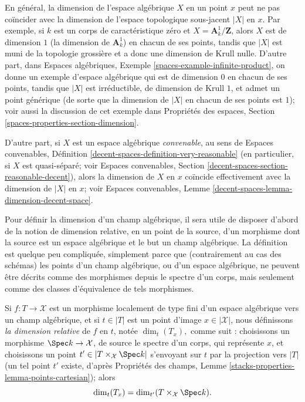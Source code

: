 \begin{remark}
\label{remark-dimension-algebraic-space}
En général, la dimension de l'espace algébrique $X$ en un point $x$
peut ne pas coïncider avec la dimension de l'espace topologique sous-jacent
$|X|$ en $x$. Par exemple, si $k$ est un corps de caractéristique zéro et
$X =  \mathbf{A}^1_k / \mathbf{Z}$, alors $X$ est de dimension $1$ (la dimension
de $\mathbf{A}^1_k$) en chacun de ses points,
tandis que $|X|$ est muni de la topologie grossière et a donc une
dimension de Krull nulle. D'autre part, dans
Espaces algébriques, Exemple \ref{spaces-example-infinite-product},
on donne un exemple d'espace algébrique
qui est de dimension $0$ en chacun de ses points, tandis que $|X|$ est
irréductible, de dimension de Krull $1$, et admet un point générique (de sorte que la
dimension de $|X|$ en chacun de ses points est $1$); voir aussi la discussion
de cet exemple dans
Propriétés des espaces, Section \ref{spaces-properties-section-dimension}.

\medskip\noindent
D'autre part, si $X$ est un espace algébrique {\it convenable}, au sens de
Espaces convenables, Définition \ref{decent-spaces-definition-very-reasonable}
(en particulier, si $X$ est quasi-séparé; voir
Espaces convenables, Section \ref{decent-spaces-section-reasonable-decent}),
alors la dimension de $X$ en $x$ coïncide effectivement avec la dimension
de $|X|$ en $x$; voir
Espaces convenables, Lemme \ref{decent-spaces-lemma-dimension-decent-space}.
\end{remark}

\noindent
Pour définir la dimension d'un champ algébrique,
il sera utile de disposer d'abord de la notion de dimension relative,
en un point de la source,
d'un morphisme dont la source est un espace algébrique
et le but un champ algébrique. La définition est quelque peu
compliquée, simplement parce que (contrairement au cas des schémas) les points d'un
champ algébrique, ou d'un espace
algébrique, ne peuvent être décrits comme des morphismes depuis le spectre d'un corps,
mais seulement comme des classes d'équivalence de tels morphismes.

\begin{definition}
\label{definition-relative-dimension}
Si $f : T \to \mathcal{X}$ est un morphisme localement de type fini d'un
espace algébrique vers un champ algébrique,
et si $t \in |T|$ est un point d'image $x \in | \mathcal{X}|$, nous définissons
{\it la dimension relative} de $f$ en $t$, notée
$\dim_t(T_x),$
comme suit :
choisissons un morphisme $\Spec k \to \mathcal{X}$, de source le spectre d'un
corps, qui représente $x$, et choisissons un point
$t' \in |T \times_{\mathcal{X}} \Spec k|$
s'envoyant sur $t$ par la projection vers $|T|$
(un tel point $t'$ existe, d'après
Propriétés des champs, Lemme \ref{stacks-properties-lemma-points-cartesian});
alors
$$
\dim_t(T_x) = \dim_{t'}(T \times_{\mathcal{X}} \Spec k ).
$$
\end{definition}

